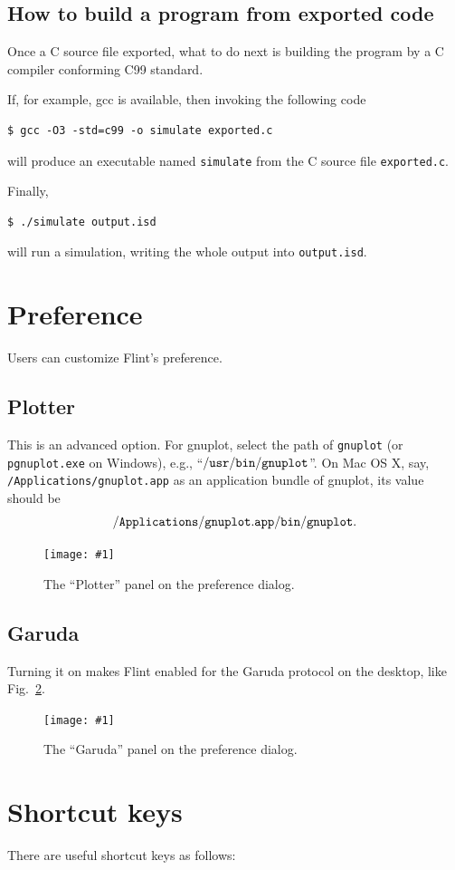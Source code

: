 \documentclass[a4paper,10pt]{report}
\newcommand\FigureOfImage[2]{\begin{figure}[h]
  \centering
  \texttt{[image: \#1]}
  \caption{#2}\label{fig:#1}
\end{figure}}
\begin{document}
\subsection{How to build a program from exported code}
Once a C source file exported, what to do next is building the program by a C compiler
conforming C99 standard.

If, for example, gcc is available, then invoking the following code
\begin{verbatim}
$ gcc -O3 -std=c99 -o simulate exported.c
\end{verbatim}
will produce an executable named {\tt simulate} from the C source file {\tt exported.c}.

Finally,
\begin{verbatim}
$ ./simulate output.isd
\end{verbatim}
will run a simulation, writing the whole output into {\tt output.isd}.

\section{Preference}
\label{sec:preference}
Users can customize Flint's preference.

\subsection{Plotter}
This is an advanced option.
For gnuplot, select the path of {\tt gnuplot} (or {\tt pgnuplot.exe} on Windows),
e.g., ``$\tt{/usr/bin/gnuplot}$''. On Mac OS X, say,
{\tt /Applications/gnuplot.app} as an application bundle of gnuplot, its value
should be \[{\tt /Applications/gnuplot.app/bin/gnuplot}.\]
\FigureOfImage{preference-plotter}{The ``Plotter'' panel on the preference dialog.}

\subsection{Garuda}
\label{subsec:Garuda}
Turning it on makes Flint enabled for the Garuda protocol on the desktop, like
Fig.~\ref{fig:preference-garuda}.
\FigureOfImage{preference-garuda}{The ``Garuda'' panel on the preference dialog.}

\section{Shortcut keys}
There are useful shortcut keys as follows:
\end{document}
